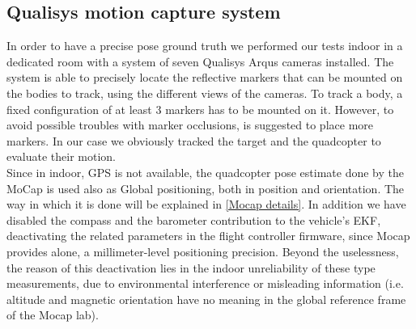 \subsection{Qualisys motion capture system}
In order to have a precise pose ground truth we performed our tests indoor in a dedicated room with a system of seven Qualisys Arqus cameras installed. The system is able to precisely locate the reflective markers that can be mounted on the bodies to track, using the different views of the cameras. To track a body, a fixed configuration of at least 3 markers has to be mounted on it. However, to avoid possible troubles with marker occlusions, is suggested to place more markers. In our case we obviously tracked the target and the quadcopter to evaluate their motion. \\
Since in indoor, GPS is not available, the quadcopter pose estimate done by the MoCap is used also as Global positioning, both in position and orientation. The way in which it is done will be explained in \autoref{Mocap details}. In addition we have disabled the compass and the barometer contribution to the vehicle's EKF, deactivating the related parameters in the flight controller firmware, since Mocap provides alone, a millimeter-level positioning precision. Beyond the uselessness, the reason of this deactivation lies in the indoor unreliability of these type measurements, due to environmental interference or misleading information (i.e. altitude and magnetic orientation have no meaning in the global reference frame of the Mocap lab).